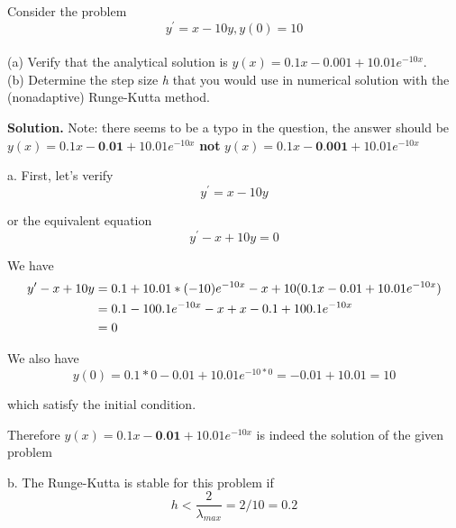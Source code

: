 \begin{exercise}{5} %
Consider the problem $$ y^\prime = x-10y, y(0) = 10 $$ \\
(a) Verify that the analytical solution is $y(x) = 0.1x-0.001 + 10.01e^{-10x}$.\\ (b) Determine the step size \textit{h} that you would use in numerical solution with the (nonadaptive) Runge-Kutta method.

\textbf{Solution.}
Note: there seems to be a typo in the question, the answer should be $y(x)=0.1x-\textbf{0.01} + 10.01e^{-10x}$ \textbf{not} $y(x)=0.1x-\textbf{0.001} + 10.01e^{-10x}$


a. First, let's verify $$ y^\prime = x-10y$$

or the equivalent equation
$$ y^\prime - x+10y = 0$$

We have 
\begin{align}
   y^\prime - x+10y &= 0.1 + 10.01*(-10)e^{-10x} - x +10(0.1x-0.01 + 10.01e^{-10x}) \notag \\
   &=0.1 - 100.1e^{-10x} - x + x - 0.1 + 100.1e^{-10x} \notag \\
   &=0 \notag
\end{align}

We also have 
$$y(0) = 0.1*0 - 0.01 + 10.01e^{-10*0} = -0.01 + 10.01 = 10$$ 

which satisfy the initial condition.

Therefore $y(x)=0.1x-\textbf{0.01} + 10.01e^{-10x}$ is indeed the solution of the given problem

b. The Runge-Kutta is stable for this problem if
$$h<\frac{2}{\lambda_{max}}=2/10=0.2$$
\end{exercise}


